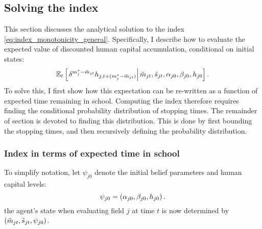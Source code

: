 \subsection{Solving the index}\label{sec:solving_index}

This section discusses the analytical solution to the index \eqref{eq:index_monotonicity_general}.
Specifically, I describe how to evaluate the expected value of discounted human capital accumulation, conditional on initial states:
\begin{equation}\label{eq:expected_discounted_hc_accumulation}
    \mathbb{E}_t \left[\left. 
        \delta^{m_j^* - \tilde{m}_{jt}}
        h_{j,t + (m_j^* - \tilde{m}_{jt})}
     \right\vert \tilde{m}_{jt}, \tilde{s}_{jt}, \alpha_{j0}, \beta_{j0}, h_{j0} \right].
\end{equation}
To solve this, I first show how this expectation can be re-written as a function of expected time remaining in school.
Computing the index therefore requires finding the conditional probability distribution of stopping times. 
The remainder of section is devoted to finding this distribution. 
This is done by first bounding the stopping times, and then recursively defining the probability distribution. 

\subsubsection*{Index in terms of expected time in school}

To simplify notation, let $\psi_{j0}$ denote the initial belief parameters and human capital levels:
\begin{equation*}
    \psi_{j0} = \left( \alpha_{j0}, \beta_{j0}, h_{j0} \right).
\end{equation*}
the agent's state when evaluating field $j$ at time $t$ is now determined by $\left( \tilde{m}_{jt}, \tilde{s}_{jt}, \psi_{j0} \right)$.

